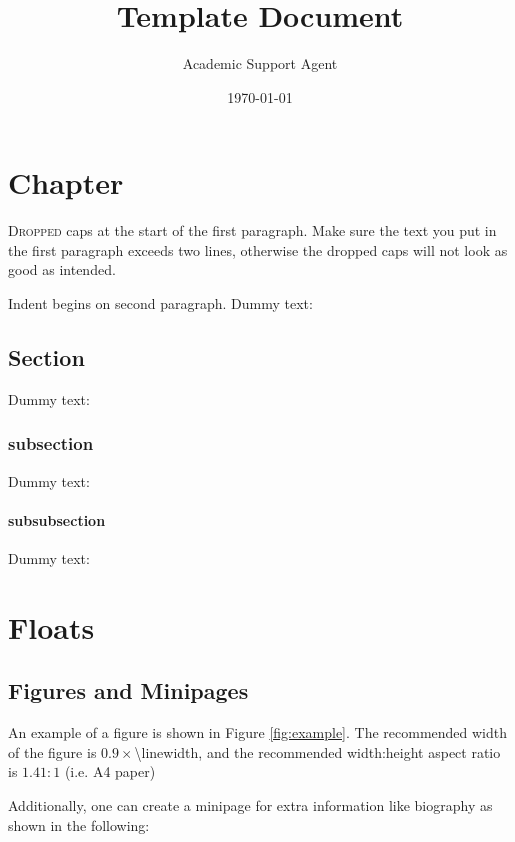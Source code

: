 \documentclass{article}
\title{Template Document}
\author{Academic Support Agent}
\date{\today}
\begin{document}
\maketitle

\maketitle



\setcounter{page}{0}

\chapter{Chapter}

\lettrine{D}{ropped} caps at the start of the first paragraph. Make sure the text you put in the first paragraph exceeds two lines, otherwise the dropped caps will not look as good as intended.

Indent begins on second paragraph.
Dummy text: \lipsum[1]

\section{Section}
Dummy text: \lipsum[1]

\subsection{subsection}
Dummy text: \lipsum[1]

\subsubsection{subsubsection}
Dummy text: \lipsum[1]

\chapter{Floats}
\section{Figures and Minipages}
An example of a figure is shown in Figure \ref{fig:example}. The recommended width of the figure is $0.9\times$\textbackslash linewidth, and the recommended width:height aspect ratio is $1.41:1$ (i.e. A4 paper)

Additionally, one can create a minipage for extra information like biography as shown in the following:

\end{document}
